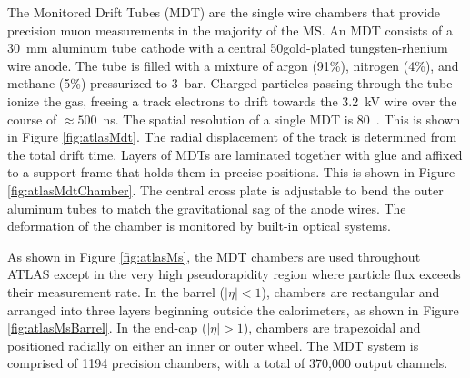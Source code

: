 \begin{figure}[h!]
\captionsetup[subfigure]{position=b}
\centering
{}
\caption{}
\label{fig:}
\end{figure}

The Monitored Drift Tubes (MDT) are the single wire chambers that provide precision muon measurements in the majority of the MS.
An MDT consists of a 30~mm aluminum tube cathode with a central 50\um gold-plated tungsten-rhenium wire anode.
The tube is filled with a mixture of argon (91\%), nitrogen (4\%), and methane (5\%) pressurized to 3~bar.
Charged particles passing through the tube ionize the gas, freeing a track electrons to drift towards the 3.2~kV wire over the course of $\approx500$~ns.
The spatial resolution of a single MDT is 80~\um.
This is shown in Figure \ref{fig:atlasMdt}.
The radial displacement of the track is determined from the total drift time.
Layers of MDTs are laminated together with glue and affixed to a support frame that holds them in precise positions.
This is shown in Figure \ref{fig:atlasMdtChamber}.
The central cross plate is adjustable to bend the outer aluminum tubes to match the gravitational sag of the anode wires.
The deformation of the chamber is monitored by built-in optical systems.

As shown in Figure \ref{fig:atlasMs}, the MDT chambers are used throughout ATLAS except in the very high pseudorapidity region where particle flux exceeds their measurement rate.
In the barrel ($|\eta|<1$), chambers are rectangular and arranged into three layers beginning outside the calorimeters, as shown in Figure \ref{fig:atlasMsBarrel}.
In the end-cap ($|\eta|>1$), chambers are trapezoidal and positioned radially on either an inner or outer wheel.
The MDT system is comprised of 1194 precision chambers, with a total of 370,000 output channels.

